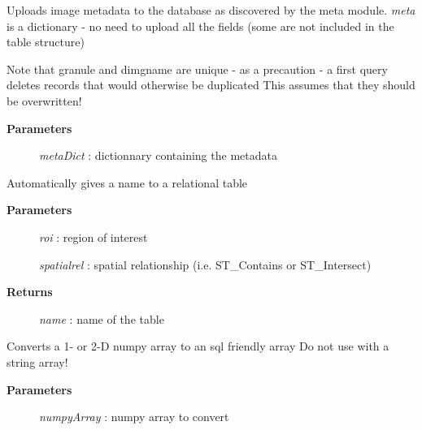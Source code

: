 \documentclass[letterpaper,10pt,english]{sphinxmanual}
\begin{document}
\begin{fulllineitems}
\begin{fulllineitems}
\end{fulllineitems}


\begin{fulllineitems}
\label{code:Database.Database.meta2db}
Uploads image metadata to the database as discovered by the meta module.
\emph{meta} is a dictionary - no need to upload all the fields (some are not
included in the table structure)

Note that granule and dimgname are unique - as a precaution - a first query
deletes records that would otherwise be duplicated 
This assumes that they should be overwritten!
\begin{description}
\item[{\textbf{Parameters}}] \leavevmode
\emph{metaDict}  : dictionnary containing the metadata

\end{description}

\end{fulllineitems}


\begin{fulllineitems}
\label{code:Database.Database.nameTable}
Automatically gives a name to a relational table
\begin{description}
\item[{\textbf{Parameters}}] \leavevmode
\emph{roi}   :   region of interest

\emph{spatialrel}    :   spatial relationship (i.e. ST\_Contains or ST\_Intersect)

\item[{\textbf{Returns}}] \leavevmode
\emph{name}   :  name of the table

\end{description}

\end{fulllineitems}


\begin{fulllineitems}
\label{code:Database.Database.numpy2sql}
Converts a 1- or 2-D numpy array to an sql friendly array
Do not use with a string array!
\begin{description}
\item[{\textbf{Parameters}}] \leavevmode
\emph{numpyArray}    :   numpy array to convert


\end{description}
\end{fulllineitems}
\end{fulllineitems}
\end{document}
